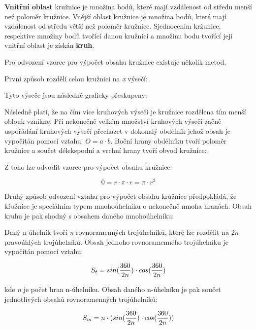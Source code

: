 {\bf Vnitřní oblast} kružnice je množina bodů, které mají vzdálenost od středu menší než poloměr kružnice. Vnější oblast kružnice je množina bodů, které mají vzdálenost od středu větší než poloměr kružnice. Sjednocením kržunice, respektive množiny bodů tvořící danou kružnici a množinu bodu tvořící její vnitřní oblast je získán {\bf kruh}.


\vskip 4mm
\centerline{}
\vskip 4mm



Pro odvození vzorce pro výpočet obsahu kružnice existuje několik metod. 

První způsob rozdělí celou kružnici na {\it x} výsečí:

\vskip 4mm
\centerline{}
\vskip 4mm

Tyto výseče jsou následně graficky přeskupeny:

\vskip 4mm
\centerline{}
\vskip 4mm


Následně platí, že na čím více kruhových výsečí je kružnice rozdělena tím menší oblouk vznikne. Při nekonečně velkém množství kruhových výsečí začně uspořádání kruhových výsečí přecházet v dokonalý obdélník jehož obsah je vypočítán pomocí vztahu: $O = a \cdot b$. Boční hrany obdélníku tvoří poloměr kružnice a součet délekspodní a vrchní hrany tvoří obvod kružnice:

\vskip 4mm
\centerline{}
\vskip 4mm

Z toho lze odvodit vzorec pro výpočet obsahu kružnice:

$$ 0 = r \cdot \pi \cdot r = \pi \cdot r^2 $$

Druhý způsob odvození vztahu pro výpočet obsahu kružnice předpokládá, že křužnice je speciálním typem mnohoúhelníku o nekonečně mnoha hranách. Obsah kruhu je pak shodný s obsahem daného mnohoúhelníku:

\vskip 4mm
\centerline{}
\vskip 4mm

Daný n-úhelník tvoří {\it n} rovnoramenných trojúhelníků, které lze rozdělit na $2n$ pravoúhlých trojúhelníků. Obsah jednoho rovnoramenného trojúhelníku je vypočítán pomocí vztahu:

$$ S_t = sin({360\over 2n})\cdot cos({360\over2n}) $$

kde {\it n} je počet hran n-úhelníku. Obsah daného n-úhelníku je pak součet jednotlivých obsahů rovnoramenných trojúhelníků:

$$ S_m = n\cdot (sin({360\over 2n})\cdot cos({360\over 2n})) $$

